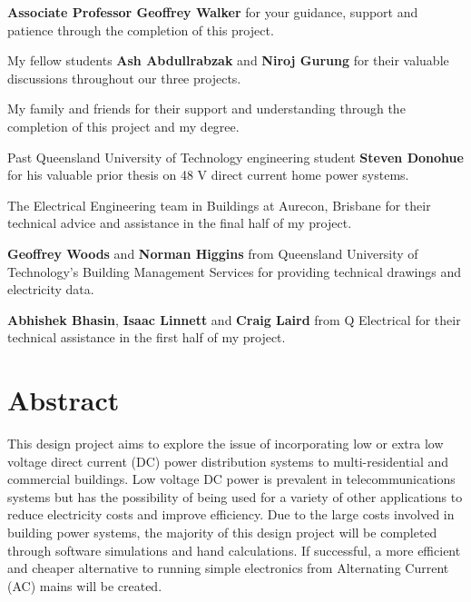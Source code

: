 \textbf{Associate Professor Geoffrey Walker} for your guidance, support and patience through the completion of this project. 
\newline

My fellow students \textbf{Ash Abdullrabzak} and \textbf{Niroj Gurung} for their valuable discussions throughout our three projects. 
\newline

My family and friends for their support and understanding through the completion of this project and my degree.    
\newline

Past Queensland University of Technology engineering student \textbf{Steven Donohue} for his valuable prior thesis on 48 V direct current home power systems.  
\newline

The Electrical Engineering team in Buildings at Aurecon, Brisbane for their technical advice and assistance in the final half of my project.  
\newline

\textbf{Geoffrey Woods} and \textbf{Norman Higgins} from Queensland University of Technology's Building Management Services for providing technical drawings and electricity data.
\newline

\textbf{Abhishek Bhasin}, \textbf{Isaac Linnett} and \textbf{Craig Laird} from Q Electrical for their technical assistance in the first half of my project.



\newpage


\section*{Abstract}
This design project aims to explore the issue of incorporating low or extra low voltage direct current (DC) power distribution systems to multi-residential and commercial buildings. Low voltage DC power is prevalent in telecommunications systems but has the possibility of being used for a variety of other applications to reduce electricity costs and improve efficiency. Due to the large costs involved in building power systems, the majority of this design project will be completed through software simulations and hand calculations. If successful, a more efficient and cheaper alternative to running simple electronics from Alternating Current (AC) mains will be created. 
\newline

